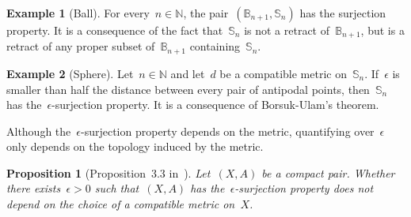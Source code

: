 \documentclass[english,11pt]{article}
\theoremstyle{plain}
\newtheorem{proposition}{Proposition}[section]
\theoremstyle{remark}
\theoremstyle{definition}
\newtheorem{example}{Example}[section]
\newcommand{\Sp}{\mathbb{S}}
\newcommand{\BB}{\mathbb{B}}
\newcommand{\R}{\mathbb{R}}
\newcommand{\N}{\mathbb{N}}
\begin{document}
\begin{example}[Ball]\label{example ball sphere}
For every~$n\in\mathbb{N}$, the pair~$(\BB_{n+1},\Sp_{n})$ has the surjection property. It is a consequence of  the fact that~$\Sp_n$ is not a retract of~$\BB_{n+1}$, but is a retract of any proper subset of~$\BB_{n+1}$ containing~$\Sp_n$.

\end{example}

\begin{example}[Sphere]
Let~$n\in\N$ and let~$d$ be a compatible metric on~$\Sp_n$. If~$\epsilon$ is smaller than half the distance between every pair of antipodal points, then~$\Sp_n$ has the~$\epsilon$-surjection property. It is a consequence of Borsuk-Ulam's theorem.
\end{example}

Although the~$\epsilon$-surjection property depends on the metric, quantifying over~$\epsilon$ only depends on the topology induced by the metric.
\begin{proposition}[Proposition~3.3 in~\cite{AH22}]
Let~$(X,A)$ be a compact pair. Whether there exists~$\epsilon>0$ such that~$(X,A)$ has the~$\epsilon$-surjection property does not depend on the choice of a compatible metric on~$X$. 
\end{proposition}
\end{document}
